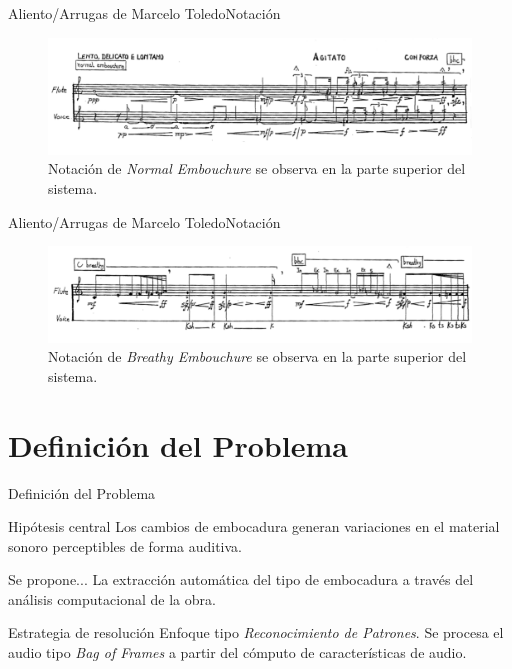 \documentclass[aspectratio=169]{beamer}
\begin{document}
\begin{frame}{Aliento/Arrugas de Marcelo Toledo}{Notación}
\begin{figure}[H]
\begin{center}
\includegraphics[width=1\textwidth]{normal} 
\caption{Notación de \textit{Normal Embouchure} se observa en la parte superior del sistema.}
\end{center}
\end{figure}
\end{frame}

\begin{frame}{Aliento/Arrugas de Marcelo Toledo}{Notación}
\begin{figure}[H]
\begin{center}
\includegraphics[width=1\textwidth]{breathy} 
\caption{Notación de \textit{Breathy Embouchure} se observa en la parte superior del sistema.}
\end{center}
\end{figure}
\end{frame}

\section{Definición del Problema}

\begin{frame}{Definición del Problema}
\begin{block}{Hipótesis central} 
Los cambios de embocadura generan variaciones en el material sonoro perceptibles de forma auditiva.
\end{block}
\begin{block}{Se propone...} 
La extracción automática del tipo de embocadura a través del análisis computacional de la obra.
\end{block}
\begin{block}{Estrategia de resolución}
Enfoque tipo \textit{Reconocimiento de Patrones}. Se procesa el audio tipo \textit{Bag of Frames} a partir del cómputo de características de audio.
\end{block}
\end{frame}
\end{document}
